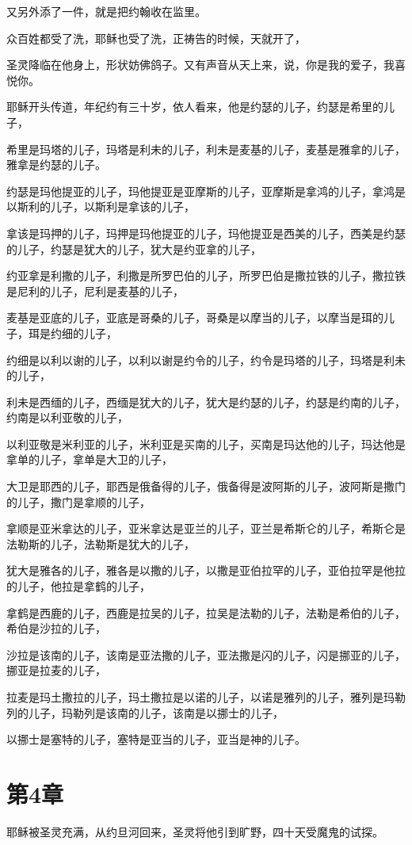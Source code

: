 \documentclass[12pt,oneside]{book}
\begin{document}
又另外添了一件，就是把约翰收在监里。

众百姓都受了洗，耶稣也受了洗，正祷告的时候，天就开了，

圣灵降临在他身上，形状妨佛鸽子。又有声音从天上来，说，你是我的爱子，我喜悦你。

耶稣开头传道，年纪约有三十岁，依人看来，他是约瑟的儿子，约瑟是希里的儿子，

希里是玛塔的儿子，玛塔是利未的儿子，利未是麦基的儿子，麦基是雅拿的儿子，雅拿是约瑟的儿子。

约瑟是玛他提亚的儿子，玛他提亚是亚摩斯的儿子，亚摩斯是拿鸿的儿子，拿鸿是以斯利的儿子，以斯利是拿该的儿子，

拿该是玛押的儿子，玛押是玛他提亚的儿子，玛他提亚是西美的儿子，西美是约瑟的儿子，约瑟是犹大的儿子，犹大是约亚拿的儿子，

约亚拿是利撒的儿子，利撒是所罗巴伯的儿子，所罗巴伯是撒拉铁的儿子，撒拉铁是尼利的儿子，尼利是麦基的儿子，

麦基是亚底的儿子，亚底是哥桑的儿子，哥桑是以摩当的儿子，以摩当是珥的儿子，珥是约细的儿子，

约细是以利以谢的儿子，以利以谢是约令的儿子，约令是玛塔的儿子，玛塔是利未的儿子，

利未是西缅的儿子，西缅是犹大的儿子，犹大是约瑟的儿子，约瑟是约南的儿子，约南是以利亚敬的儿子，

以利亚敬是米利亚的儿子，米利亚是买南的儿子，买南是玛达他的儿子，玛达他是拿单的儿子，拿单是大卫的儿子，

大卫是耶西的儿子，耶西是俄备得的儿子，俄备得是波阿斯的儿子，波阿斯是撒门的儿子，撒门是拿顺的儿子，

拿顺是亚米拿达的儿子，亚米拿达是亚兰的儿子，亚兰是希斯仑的儿子，希斯仑是法勒斯的儿子，法勒斯是犹大的儿子，

犹大是雅各的儿子，雅各是以撒的儿子，以撒是亚伯拉罕的儿子，亚伯拉罕是他拉的儿子，他拉是拿鹤的儿子，

拿鹤是西鹿的儿子，西鹿是拉吴的儿子，拉吴是法勒的儿子，法勒是希伯的儿子，希伯是沙拉的儿子，

沙拉是该南的儿子，该南是亚法撒的儿子，亚法撒是闪的儿子，闪是挪亚的儿子，挪亚是拉麦的儿子，

拉麦是玛土撒拉的儿子，玛土撒拉是以诺的儿子，以诺是雅列的儿子，雅列是玛勒列的儿子，玛勒列是该南的儿子，该南是以挪士的儿子，

以挪士是塞特的儿子，塞特是亚当的儿子，亚当是神的儿子。

\chapter{第4章}
耶稣被圣灵充满，从约旦河回来，圣灵将他引到旷野，四十天受魔鬼的试探。
\end{document}
